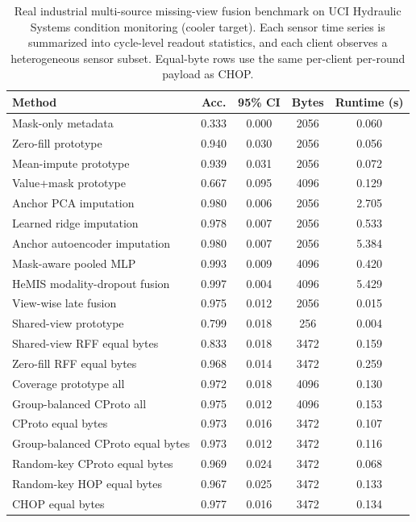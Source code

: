 \begin{table}[t]
\centering
\caption{Real industrial multi-source missing-view fusion benchmark on UCI Hydraulic Systems condition monitoring (cooler target). Each sensor time series is summarized into cycle-level readout statistics, and each client observes a heterogeneous sensor subset. Equal-byte rows use the same per-client per-round payload as CHOP.}
\label{tab:if-hydraulic-fusion}
\scriptsize
\setlength{\tabcolsep}{3pt}
\renewcommand{\arraystretch}{0.94}
\begin{tabular}{lcccc}
\toprule
Method & Acc. & 95\% CI & Bytes & Runtime (s) \\
\midrule
Mask-only metadata & 0.333 & 0.000 & 2056 & 0.060 \\
Zero-fill prototype & 0.940 & 0.030 & 2056 & 0.056 \\
Mean-impute prototype & 0.939 & 0.031 & 2056 & 0.072 \\
Value+mask prototype & 0.667 & 0.095 & 4096 & 0.129 \\
Anchor PCA imputation & 0.980 & 0.006 & 2056 & 2.705 \\
Learned ridge imputation & 0.978 & 0.007 & 2056 & 0.533 \\
Anchor autoencoder imputation & 0.980 & 0.007 & 2056 & 5.384 \\
Mask-aware pooled MLP & 0.993 & 0.009 & 4096 & 0.420 \\
HeMIS modality-dropout fusion & 0.997 & 0.004 & 4096 & 5.429 \\
View-wise late fusion & 0.975 & 0.012 & 2056 & 0.015 \\
Shared-view prototype & 0.799 & 0.018 & 256 & 0.004 \\
Shared-view RFF equal bytes & 0.833 & 0.018 & 3472 & 0.159 \\
Zero-fill RFF equal bytes & 0.968 & 0.014 & 3472 & 0.259 \\
Coverage prototype all & 0.972 & 0.018 & 4096 & 0.130 \\
Group-balanced CProto all & 0.975 & 0.012 & 4096 & 0.153 \\
CProto equal bytes & 0.973 & 0.016 & 3472 & 0.107 \\
Group-balanced CProto equal bytes & 0.973 & 0.012 & 3472 & 0.116 \\
Random-key CProto equal bytes & 0.969 & 0.024 & 3472 & 0.068 \\
Random-key HOP equal bytes & 0.967 & 0.025 & 3472 & 0.133 \\
CHOP equal bytes & 0.977 & 0.016 & 3472 & 0.134 \\
\bottomrule
\end{tabular}
\end{table}
